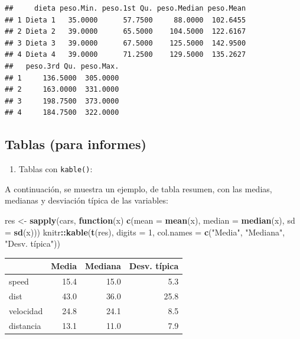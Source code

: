 \documentclass[
]{book}
\newenvironment{Shaded}{\begin{snugshade}}{\end{snugshade}}
\newcommand{\AttributeTok}[1]{\textcolor[rgb]{0.13,0.29,0.53}{#1}}
\newcommand{\ControlFlowTok}[1]{\textcolor[rgb]{0.13,0.29,0.53}{\textbf{#1}}}
\newcommand{\DecValTok}[1]{\textcolor[rgb]{0.00,0.00,0.81}{#1}}
\newcommand{\FunctionTok}[1]{\textcolor[rgb]{0.13,0.29,0.53}{\textbf{#1}}}
\newcommand{\NormalTok}[1]{#1}
\newcommand{\OtherTok}[1]{\textcolor[rgb]{0.56,0.35,0.01}{#1}}
\newcommand{\SpecialCharTok}[1]{\textcolor[rgb]{0.81,0.36,0.00}{\textbf{#1}}}
\newcommand{\StringTok}[1]{\textcolor[rgb]{0.31,0.60,0.02}{#1}}
\providecommand{\tightlist}{%
  \setlength{\itemsep}{0pt}\setlength{\parskip}{0pt}}
\begin{document}
\begin{verbatim}
##     dieta peso.Min. peso.1st Qu. peso.Median peso.Mean
## 1 Dieta 1   35.0000      57.7500     88.0000  102.6455
## 2 Dieta 2   39.0000      65.5000    104.5000  122.6167
## 3 Dieta 3   39.0000      67.5000    125.5000  142.9500
## 4 Dieta 4   39.0000      71.2500    129.5000  135.2627
##   peso.3rd Qu. peso.Max.
## 1     136.5000  305.0000
## 2     163.0000  331.0000
## 3     198.7500  373.0000
## 4     184.7500  322.0000
\end{verbatim}

\hypertarget{tablas-para-informes}{%
\subsection{Tablas (para informes)}\label{tablas-para-informes}}

\begin{enumerate}
\def\labelenumi{\alph{enumi}.}
\tightlist
\item
  Tablas con \texttt{kable()}:
\end{enumerate}

A continuación, se muestra un ejemplo, de tabla resumen, con las medias, medianas y desviación típica de las variables:

\begin{Shaded}
\begin{Highlighting}[]
\NormalTok{res }\OtherTok{\textless{}{-}} \FunctionTok{sapply}\NormalTok{(cars, }
          \ControlFlowTok{function}\NormalTok{(x) }\FunctionTok{c}\NormalTok{(}\AttributeTok{mean =} \FunctionTok{mean}\NormalTok{(x), }
                        \AttributeTok{median =} \FunctionTok{median}\NormalTok{(x), }
                        \AttributeTok{sd =} \FunctionTok{sd}\NormalTok{(x)))}
\NormalTok{knitr}\SpecialCharTok{::}\FunctionTok{kable}\NormalTok{(}\FunctionTok{t}\NormalTok{(res), }\AttributeTok{digits =} \DecValTok{1}\NormalTok{, }
             \AttributeTok{col.names =} \FunctionTok{c}\NormalTok{(}\StringTok{"Media"}\NormalTok{, }\StringTok{"Mediana"}\NormalTok{, }\StringTok{"Desv. típica"}\NormalTok{))}
\end{Highlighting}
\end{Shaded}

\begin{tabular}{l|r|r|r}
\hline
  & Media & Mediana & Desv. típica\\
\hline
speed & 15.4 & 15.0 & 5.3\\
\hline
dist & 43.0 & 36.0 & 25.8\\
\hline
velocidad & 24.8 & 24.1 & 8.5\\
\hline
distancia & 13.1 & 11.0 & 7.9\\
\hline
\end{tabular}
\end{document}

